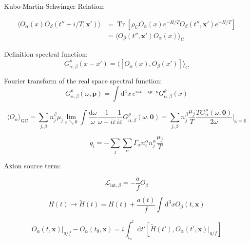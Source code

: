 \documentclass[master,       %
               twoside,        %
               BCOR10mm,       %
               english,ngerman, %
               ]{GAUBM}
\begin{document}
\begin{otherlanguage}{english}
Kubo-Martin-Schwinger Relation:

\begin{align}
	\langle O_\alpha(x) O_\beta(t'' + i/T, \mathbf{x}') \rangle &= \operatorname{Tr} [ \rho_C O_\alpha(x) e^{- H / T} O_\beta(t'', \mathbf{x}') e^{+ H / T}] \nonumber \\ &= \langle O_\beta(t'', \mathbf{x}') O_\alpha(x) \rangle_{\mathrm{C}}
\end{align}

Definition spectral function:
\begin{equation}
	G^\rho_{\alpha, \beta}(x - x') = \langle [ O_\alpha(x), O_\beta(x')] \rangle_{\mathrm{C}}
\end{equation}

Fourier transform of the real space spectral function:
\begin{equation}
	G^\rho_{\alpha, \beta}(\omega, \mathbf{p}) = \int \mathrm{d}^4 x \, e^{i \omega t - i \mathbf{p} \cdot \mathbf{x}} G^\rho_{\alpha, \beta}(x)
\end{equation}

\begin{equation}
	\langle O_\alpha \rangle_\mathrm{GC} = \sum_{j, \beta} n^\beta_j \mu_j \lim_{\varepsilon \searrow 0} \int \frac{\mathrm{d} \omega}{\omega} \frac{1}{\omega - i \varepsilon} \frac{1}{i \varepsilon} G^\rho_{\alpha, \beta}(\omega, \mathbf{0}) = \sum_{j, \beta} n^\beta_j \frac{\mu_j}{T} \frac{T G^\rho_\alpha(\omega, \mathbf{0})}{2\omega} \big|_{\omega = 0}
\end{equation}

\begin{equation}
	\dot{q}_i = - \sum_j \sum_\alpha \Gamma_\alpha n_i^\alpha n_j^\alpha \frac{\mu_j}{T}
\end{equation}

Axion source term:

\begin{equation}
	\mathcal{L}_{\mathrm{int}, \beta} = - \frac{a}{f} O_\beta
\end{equation}

\begin{equation}
	H(t) \to \tilde{H}(t) = H(t) + \frac{a(t)}{f} \int \mathrm{d}^3 x  O_\beta(t, \mathbf{x})
\end{equation}

\begin{equation}
	O_\alpha(t, \mathbf{x})|_{a/f} - O_\alpha(t_0, \mathbf{x}) = i \int_{t_0}^{t} \mathrm{d} t' [\tilde{H}(t'), O_\alpha(t', \mathbf{x})|_{a / f}]
\end{equation}


\end{otherlanguage}
\end{document}
